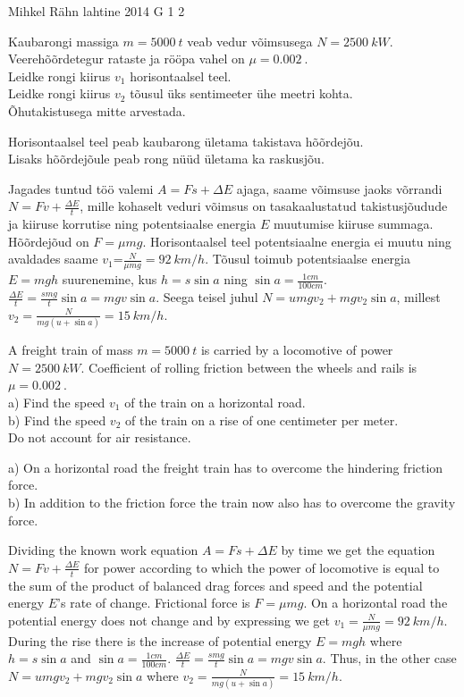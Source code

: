 {Mihkel Rähn} %
{lahtine} %
{2014} %
{G 1} %
{2} %
{
\ifStatement
Kaubarongi massiga $m=\SI{5000}{t}$ veab vedur võimsusega $N=\SI{2500}{kW}$. Veerehõõrdetegur rataste ja rööpa vahel on $\mu=\SI{0,002}{}$.\\
\osa Leidke rongi kiirus $v_1$ horisontaalsel teel.\\
\osa Leidke rongi kiirus $v_2$ tõusul üks sentimeeter ühe meetri kohta.\\
Õhutakistusega mitte arvestada.
\fi


\ifHint
\osa Horisontaalsel teel peab kaubarong ületama takistava hõõrdejõu.\\
\osa Lisaks hõõrdejõule peab rong nüüd ületama ka raskusjõu.
\fi


\ifSolution
Jagades tuntud töö valemi $A=Fs+\Delta E$ ajaga, saame võimsuse jaoks võrrandi $N=Fv+\frac{\Delta E}{t}$, mille kohaselt veduri võimsus on tasakaalustatud takistusjõudude ja kiiruse korrutise ning potentsiaalse energia $E$ muutumise kiiruse summaga. Hõõrdejõud on $F=\mu mg$. Horisontaalsel teel potentsiaalne energia ei muutu ning avaldades saame $v_1$=$\frac{N}{\mu mg}=\SI{92}{km \per h}$. Tõusul toimub potentsiaalse energia $E=mgh$ suurenemine, kus $h=s\sin a$ ning $\sin a=\frac{1cm}{100cm}$. $\frac{\Delta E}{t}=\frac{smg}{t}\sin a=mgv\sin a$.
Seega teisel juhul $N=umgv_2+mgv_2\sin a$, millest $v_2=\frac{N}{mg(u+\sin a)}=\SI{15}{km \per h}$.
\fi


\ifEngStatement
A freight train of mass $m=\SI{5000}{t}$ is carried by a locomotive of power $N=\SI{2500}{kW}$. Coefficient of rolling friction between the wheels and rails is $\mu=\SI{0,002}{}$.\\
a) Find the speed $v_1$ of the train on a horizontal road.\\
b) Find the speed $v_2$ of the train on a rise of one centimeter per meter.\\
Do not account for air resistance.
\fi


\ifEngHint
a) On a horizontal road the freight train has to overcome the hindering friction force.\\
b) In addition to the friction force the train now also has to overcome the gravity force.
\fi


\ifEngSolution
Dividing the known work equation $A=Fs+\Delta E$ by time we get the equation $N=Fv+\frac{\Delta E}{t}$ for power according to which the power of locomotive is equal to the sum of the product of balanced drag forces and speed and the potential energy $E$’s rate of change. Frictional force is $F=\mu mg$. On a horizontal road the potential energy does not change and by expressing we get $v_1=\frac{N}{\mu mg}=\SI{92}{km \per h}$. During the rise there is the increase of potential energy $E=mgh$ where $h=s\sin a$ and $\sin a= \frac{1cm}{100cm}$. $\frac{\Delta E}{t}=\frac{smg}{t}\sin a=mgv\sin a$. Thus, in the other case $N=umgv_2+mgv_2\sin a$ where $v_2=\frac{N}{mg(u+\sin a)}=\SI{15}{km \per h}$.
\fi
}